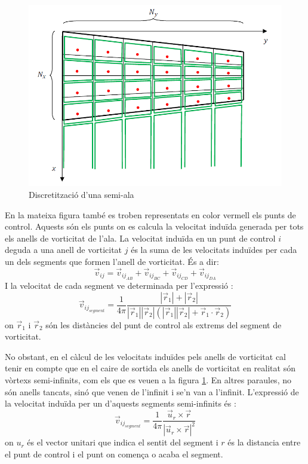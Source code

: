 \begin{figure}[h]
	\centering
	\includegraphics[scale=0.5]{./plots/discretitzacio}
	\caption{Discretització d'una semi-ala \cite{LizandraDalmases2017b}}
	\label{discretit}
\end{figure}

En la mateixa figura també es troben representats en color vermell els punts de control. Aquests són els punts on es calcula la velocitat induïda generada per tots els anells de vorticitat de l'ala. La velocitat induïda en un punt de control $i$ deguda a una anell de vorticitat $j$ és la suma de les velocitats induïdes per cada un dels segments que formen l'anell de vorticitat. És a dir:
\begin{equation}
\vec{v}_{ij}=\vec{v}_{ij_{AB}}+\vec{v}_{ij_{BC}}+\vec{v}_{ij_{CD}}+\vec{v}_{ij_{DA}}
\end{equation}
I la velocitat de cada segment ve determinada per l'expressió \cite{LizandraDalmases2017}:
\begin{equation}
\vec{v}_{ij_{segment}}=\frac{1}{4\pi}\frac{|\vec{r}_{1}|+|\vec{r}_{2}|}{|\vec{r}_{1}||\vec{r}_{2}|(|\vec{r}_{1}||\vec{r}_{2}|+\vec{r}_{1}\cdot\vec{r}_{2})}
\end{equation}
on $\vec{r}_{1}$ i $\vec{r}_{2}$ són les distàncies del punt de control als extrems del segment de vorticitat.

No obstant, en el càlcul de les velocitats induïdes pels anells de vorticitat cal tenir en compte que en el caire de sortida els anells de vorticitat en realitat són vòrtexs semi-infinits, com els que es veuen a la figura \ref{discretit}. En altres paraules, no són anells tancats, sinó que venen de l'infinit i se'n van a l'infinit. L'expressió de la velocitat induïda per un d'aquests segments semi-infinits és \cite{LizandraDalmases2017}:
\begin{equation}
\vec{v}_{ij_{segment}}=\frac{1}{4\pi}\frac{\vec{u}_{r}\times\vec{r}}{|\vec{u}_{r}\times\vec{r}|^{2}}
\end{equation}
on $u_{r}$ és el vector unitari que indica el sentit del segment i $r$ és la distancia entre el punt de control i el punt on comença o acaba el segment.

